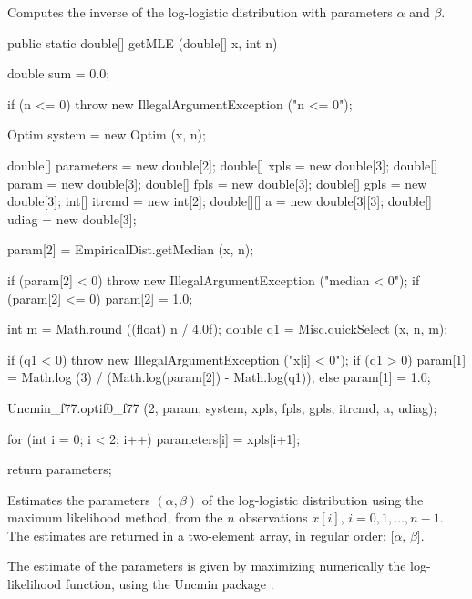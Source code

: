 \begin{tabb}
   Computes the inverse of the log-logistic distribution
   with parameters $\alpha$ and $\beta$.
 \end{tabb}
\begin{code}

   public static double[] getMLE (double[] x, int n)\begin{hide} {
      double sum = 0.0;

      if (n <= 0)
         throw new IllegalArgumentException ("n <= 0");

      Optim system = new Optim (x, n);

      double[] parameters = new double[2];
      double[] xpls = new double[3];
      double[] param = new double[3];
      double[] fpls = new double[3];
      double[] gpls = new double[3];
      int[] itrcmd = new int[2];
      double[][] a = new double[3][3];
      double[] udiag = new double[3];

      param[2] = EmpiricalDist.getMedian (x, n);

      if (param[2] < 0) throw new IllegalArgumentException ("median < 0");
      if (param[2] <= 0) param[2] = 1.0;

      int m = Math.round ((float) n / 4.0f);
      double q1 = Misc.quickSelect (x, n, m);

      if (q1 < 0) throw new IllegalArgumentException ("x[i] < 0");
      if (q1 > 0)
          param[1] = Math.log (3) / (Math.log(param[2]) - Math.log(q1));
      else
          param[1] = 1.0;

      Uncmin_f77.optif0_f77 (2, param, system, xpls, fpls, gpls, itrcmd, a, udiag);

      for (int i = 0; i < 2; i++)
         parameters[i] = xpls[i+1];

      return parameters;
   }\end{hide}
\end{code}
\begin{tabb}
   Estimates the parameters $(\alpha,\beta)$ of the log-logistic distribution
   using the maximum likelihood method, from the $n$ observations
   $x[i]$, $i = 0, 1,\ldots, n-1$. The estimates are returned in a two-element
    array, in regular order: [$\alpha$, $\beta$].
   \begin{detailed}
   The estimate of the parameters is given by maximizing numerically the
   log-likelihood function, using the Uncmin package \cite{iSCHa,iVERa}.
   \end{detailed}
\end{tabb}
